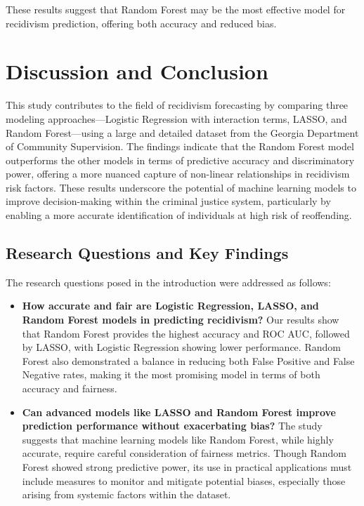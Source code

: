 \documentclass[12pt]{article}
\begin{document}
These results suggest that Random Forest may be the most effective model for recidivism prediction, offering both accuracy and reduced bias.

\section{Discussion and Conclusion}

This study contributes to the field of recidivism forecasting by comparing three modeling approaches—Logistic Regression with interaction terms, LASSO, and Random Forest—using a large and detailed dataset from the Georgia Department of Community Supervision. The findings indicate that the Random Forest model outperforms the other models in terms of predictive accuracy and discriminatory power, offering a more nuanced capture of non-linear relationships in recidivism risk factors. These results underscore the potential of machine learning models to improve decision-making within the criminal justice system, particularly by enabling a more accurate identification of individuals at high risk of reoffending.

\subsection{Research Questions and Key Findings}

The research questions posed in the introduction were addressed as follows:
\begin{itemize}
    \item \textbf{How accurate and fair are Logistic Regression, LASSO, and Random Forest models in predicting recidivism?} Our results show that Random Forest provides the highest accuracy and ROC AUC, followed by LASSO, with Logistic Regression showing lower performance. Random Forest also demonstrated a balance in reducing both False Positive and False Negative rates, making it the most promising model in terms of both accuracy and fairness.
    \item \textbf{Can advanced models like LASSO and Random Forest improve prediction performance without exacerbating bias?} The study suggests that machine learning models like Random Forest, while highly accurate, require careful consideration of fairness metrics. Though Random Forest showed strong predictive power, its use in practical applications must include measures to monitor and mitigate potential biases, especially those arising from systemic factors within the dataset.
\end{itemize}
\end{document}
